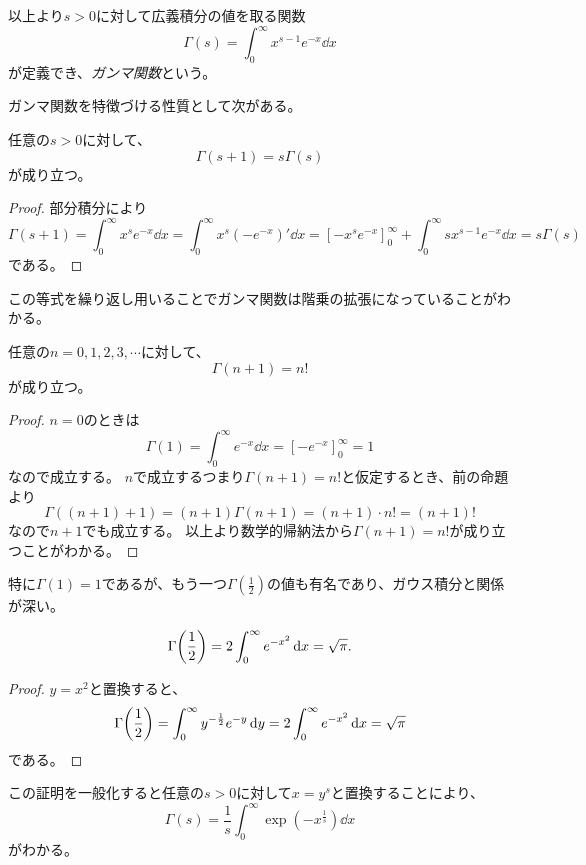 以上より$s > 0$に対して広義積分の値を取る関数
$$
\Gamma(s) = \int_0^\infty x^{s-1}e^{-x}\dd{x}
$$
が定義でき、\emph{ガンマ関数}という。

ガンマ関数を特徴づける性質として次がある。

\begin{proposition}
任意の$s > 0$に対して、
$$
\Gamma(s+1) = s\Gamma(s)
$$
が成り立つ。
\end{proposition}

\begin{proof}
部分積分により
$$
\Gamma(s+1) = \int_0^\infty x^s e^{-x}\dd{x} = \int_0^\infty x^s (-e^{-x})'\dd{x}
= [-x^s e^{-x}]_0^\infty+\int_0^\infty s x^{s-1} e^{-x}\dd{x}
= s\Gamma(s)
$$
である。
\end{proof}

この等式を繰り返し用いることでガンマ関数は階乗の拡張になっていることがわかる。

\begin{proposition}
任意の$n = 0, 1, 2, 3, \cdots$に対して、
$$
\Gamma(n+1) = n!
$$
が成り立つ。
\end{proposition}

\begin{proof}
$n = 0$のときは
$$
\Gamma(1) = \int_0^\infty e^{-x}\dd{x} = [-e^{-x}]_0^\infty = 1
$$
なので成立する。
$n$で成立するつまり$\Gamma(n+1) = n!$と仮定するとき、前の命題より
$$
\Gamma((n+1)+1) = (n+1)\Gamma(n+1) = (n+1)\cdot n! = (n+1)!
$$
なので$n+1$でも成立する。
以上より数学的帰納法から$\Gamma(n+1) = n!$が成り立つことがわかる。
\end{proof}

特に$\Gamma(1) = 1$であるが、もう一つ$\Gamma(\frac{1}{2})$の値も有名であり、ガウス積分と関係が深い。

\begin{proposition}
$$
\Gamma\qty(\frac{1}{2}) = 2\int_0^\infty e^{-x^2}\dd{x} = \sqrt{\pi}.
$$
\end{proposition}

\begin{proof}
$y = x^2$と置換すると、
$$
\Gamma\qty(\frac{1}{2}) = \int_0^\infty y^{-\frac{1}{2}}e^{-y}\dd{y} = 2\int_0^\infty e^{-x^2}\dd{x} = \sqrt{\pi}
$$
である。
\end{proof}

\begin{remark}
この証明を一般化すると任意の$s > 0$に対して$x = y^s$と置換することにより、
$$
\Gamma(s) = \frac{1}{s}\int_0^\infty \exp(-x^{\frac{1}{s}})\dd{x}
$$
がわかる。
\end{remark}
